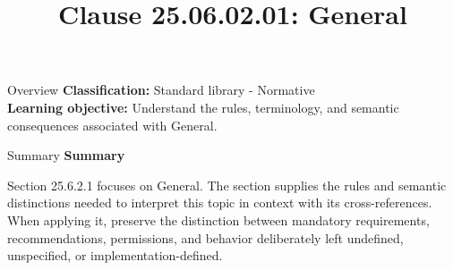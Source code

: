 \documentclass[10pt,letterpaper]{article}
\title{Clause 25.06.02.01: General}
\author{}
\date{}
\begin{document}
\maketitle
\begin{CornellOverviewBox}{Overview}
\textbf{Classification:} Standard library - Normative\\[2pt]
\textbf{Learning objective:} Understand the rules, terminology, and semantic consequences associated with General.
\end{CornellOverviewBox}\begin{CornellSummaryBox}{Summary}
{\sffamily\bfseries\color{Accent} Summary}\par\vspace{3pt}Section 25.6.2.1 focuses on General. The section supplies the rules and semantic distinctions needed to interpret this topic in context with its cross-references. When applying it, preserve the distinction between mandatory requirements, recommendations, permissions, and behavior deliberately left undefined, unspecified, or implementation-defined.
\end{CornellSummaryBox}
\end{document}
